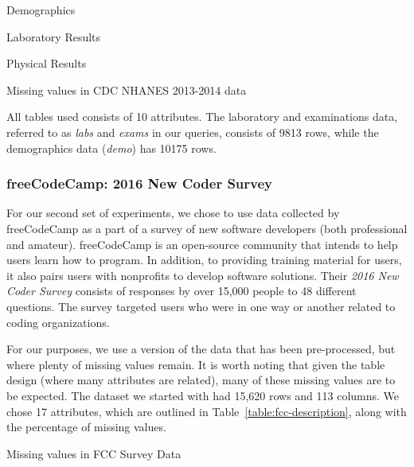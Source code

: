 \begin{table}
    \centering
    \begin{subtable}{0.5\textwidth}
        \centering
       
        \caption{Demographics}
    \end{subtable}
    \begin{subtable}{0.5\textwidth}
        \centering
        
        \caption{Laboratory Results}
    \end{subtable}
       \begin{subtable}{0.5\textwidth}
        \centering
        
        \caption{Physical Results}
    \end{subtable}
    \caption{Missing values in CDC NHANES 2013-2014 data}
    \label{table:nhanes-description} 
\end{table}

All tables used consists of 10 attributes. The laboratory and examinations data,
referred to as \textit{labs} and \textit{exams} in our queries, consists of 9813 rows,
while the demographics data (\textit{demo}) has 10175 rows.

\subsubsection{freeCodeCamp: 2016 New Coder Survey}
For our second set of experiments, we chose to use data collected
by freeCodeCamp as a part of a survey of new software developers
(both professional and amateur)\cite{fcc-data}. freeCodeCamp is an open-source
community that intends to help users learn how to program. In addition,
to providing training material for users, it also pairs users with
nonprofits to develop software solutions. Their \textit{2016 New Coder Survey} consists of responses by over 15,000 people to 48 different
questions. The survey targeted users who were in one way or another
related to coding organizations.

For our purposes, we use a version of the data that has been 
pre-processed, but where plenty of missing values remain. It is
worth noting that given the table design (where many attributes
are related), many of these missing values are to be
expected. The dataset we started with had 15,620 rows and 113
columns. We chose 17 attributes, which are outlined in Table~\ref{table:fcc-description}, along with the percentage of missing values.

\begin{table}
   \centering
    
    \caption{Missing values in FCC Survey Data}
   \label{table:fcc-description} 
\end{table}

